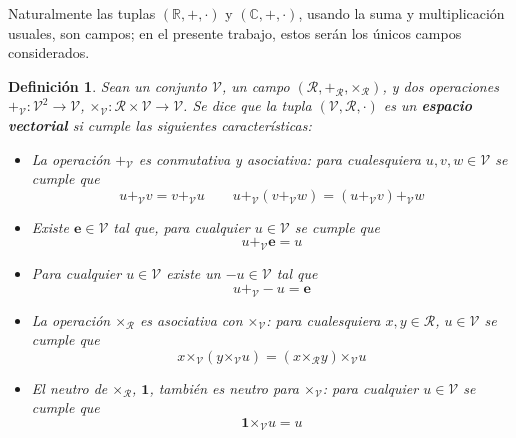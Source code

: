 \documentclass[12pt,letterpaper,draft]{book}
\newtheorem{definicion}{Definición}[chapter]
\newcommand{\R}{\mathbb{R}}
\newcommand{\C}{\mathbb{C}}
\begin{document}
Naturalmente las tuplas $(\R,+,\cdot)$ y $(\C,+,\cdot)$, usando la suma y multiplicación usuales, son campos; en el presente trabajo, estos serán los únicos campos considerados.

\begin{definicion}
Sean un conjunto $\mathcal{V}$, un campo $(\mathcal{R},\boldsymbol{+}_\mathcal{R},\boldsymbol{\times}_\mathcal{R})$, y dos operaciones $\boldsymbol{+}_\mathcal{V} : \mathcal{V}^{2} \rightarrow \mathcal{V}$, $\boldsymbol{\times}_\mathcal{V} : \mathcal{R}\times\mathcal{V} \rightarrow \mathcal{V}$. Se dice que la tupla $(\mathcal{V},\mathcal{R},\mathcal{\cdot})$ es un \textbf{espacio vectorial} si cumple las siguientes características:
\begin{itemize}
\item La operación $\boldsymbol{+}_\mathcal{V}$ es conmutativa y asociativa: para cualesquiera $u, v, w \in \mathcal{V}$ se cumple que
\begin{equation*}
u +_\mathcal{V} v = v +_\mathcal{V} u \qquad u +_\mathcal{V} (v +_\mathcal{V} w) = (u +_\mathcal{V} v) +_\mathcal{V} w
\end{equation*}
\item Existe $\boldsymbol{e} \in \mathcal{V}$ tal que, para cualquier $u \in \mathcal{V}$ se cumple que
\begin{equation*}
 u +_\mathcal{V} \boldsymbol{e} = u
\end{equation*}
\item Para cualquier $u \in \mathcal{V}$ existe un $-u \in \mathcal{V}$ tal que
\begin{equation*}
 u +_\mathcal{V} -u =  \boldsymbol{e}
\end{equation*}
\item La operación $\boldsymbol{\times}_\mathcal{R}$ es asociativa con $\boldsymbol{\times}_\mathcal{V}$: para cualesquiera $x, y \in \mathcal{R}$, $u \in \mathcal{V}$ se cumple que
\begin{equation*}
x \boldsymbol{\times}_\mathcal{V} (y \boldsymbol{\times}_\mathcal{V} u ) = (x \boldsymbol{\times}_\mathcal{R} y) \boldsymbol{\times}_\mathcal{V} u
\end{equation*}
\item El neutro de $\boldsymbol{\times}_\mathcal{R}$, $\boldsymbol{1}$, también es neutro para $\boldsymbol{\times}_\mathcal{V}$: para cualquier $u \in \mathcal{V}$ se cumple que
\begin{equation*}
\boldsymbol{1} \boldsymbol{\times}_\mathcal{V} u = u
\end{equation*}

\end{itemize}
\end{definicion}
\end{document}
